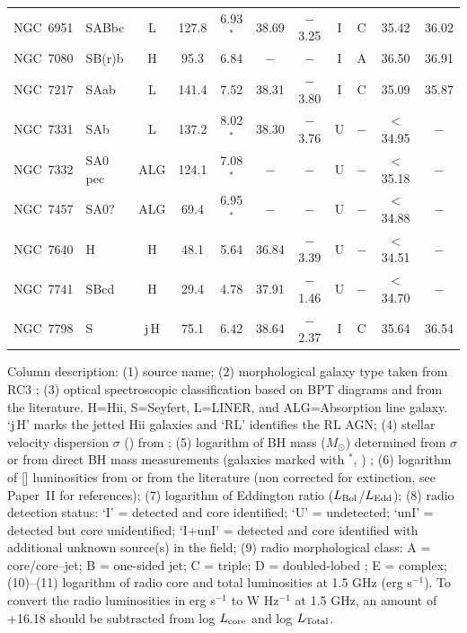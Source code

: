 \begin{center}
\begin{longtable}{lC{2.5cm}ccccccccc}
NGC~6951  & SABbc       &   L                 &   127.8   &  6.93$^{*}$  &  38.69   &  $-$3.25   &   I & C    &    35.42  & 36.02    \\
NGC~7080 & SB(r)b         & H                  & 95.3  & 6.84                 & $-$      & $-$             &  I & A         & 36.50     &  36.91            \\   
NGC~7217  & SAab       &  L                    &  141.4    &  7.52           &  38.31   &  $-$3.80    &   I & C    &   35.09   &  35.87  \\
NGC~7331  & SAb         &   L                  &   137.2    &  8.02$^{*}$   &    38.30  &  $-$3.76     &    U  &  $-$ & $<$34.95    & $-$    \\
NGC~7332  &  SA0 pec    &    ALG        &    124.1     &  7.08$^{*}$   &   $-$     &  $-$       &   U &   $-$      & $<$35.18 & $-$  \\
NGC~7457  & SA0?        &   ALG             &   69.4      &  6.95$^{*}$  &  $-$      &   $-$       &    U &  $-$      & $<$34.88 & $-$   \\
NGC~7640  & H            &   H                 &   48.1      &   5.64          &   36.84  &  $-$3.39  &   U &  $-$      & $<$34.51 & $-$  \\
NGC~7741  & SBcd       &  H                 &  29.4        &  4.78           &    37.91    & $-$1.46  & U &  $-$      & $<$34.70 & $-$ \\
NGC~7798  &  S            &  j\,H                &   75.1        &  6.42          &  38.64    &  $-$2.37   &  I  & C    &  35.64     &  36.54  \\
 \hline
\hline
\end{longtable}
\end{center}
\vspace{-1.2cm}
Column description: (1) source name; (2)   morphological galaxy type taken from RC3
\citep{devaucouleurs91}; (3) optical spectroscopic classification based on BPT diagrams
and from the literature. H=H{\sc ii}, S=Seyfert, L=LINER, and ALG=Absorption line galaxy. `j\,H' marks the jetted H{\sc ii} galaxies and `RL' identifies the RL AGN; (4) stellar velocity dispersion $\sigma$ (\kms) from
\citet{ho09}; (5) logarithm of BH mass ($M_{\odot}$) determined
from $\sigma$ \citep{tremaine02} or from direct BH mass measurements
(galaxies marked with $^{*}$, \citealt{vandenbosch16}) ; (6) logarithm of [] luminosities from \citet{ho97a} or from the literature (non corrected for extinction, see Paper~II for references); (7) logarithm of Eddington ratio ($L_{\rm Bol}$/$L_{\rm Edd}$); (8) radio detection
status: `I' = detected and core identified; `U' =
undetected; `unI' = detected but core unidentified; `I+unI' =  detected and core identified with additional unknown source(s) in the field; (9) radio
morphological class: A = core/core--jet; B = one-sided jet; C =
triple; D = doubled-lobed ; E = complex; (10)--(11) logarithm of radio core and total luminosities at 1.5 GHz (erg s$^{-1}$).  To convert the radio luminosities in erg s$^{-1}$ to W Hz$^{-1}$ at 1.5 GHz, an amount of +16.18 should be subtracted from log $L_{\rm core}$ and log $L_{\rm Total}$.
\twocolumn
